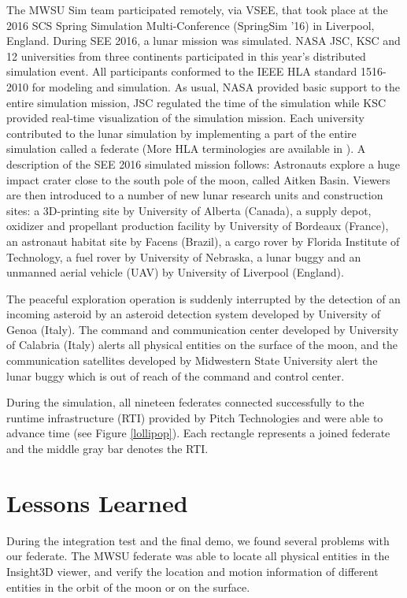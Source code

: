 \documentclass[journal, onecolumn]{IEEEtran}
\begin{document}
The MWSU Sim team participated remotely, via VSEE, that took place at the 2016 SCS Spring Simulation Multi-Conference (SpringSim '16) in Liverpool, England.  During SEE 2016, a lunar mission was simulated. NASA JSC, KSC and 12 universities from three continents participated in this year\rq{}s distributed simulation event. All participants conformed to the IEEE HLA standard 1516-2010 for modeling and simulation. As usual, NASA provided basic support to the entire simulation mission, JSC regulated the time of the simulation while KSC provided real-time visualization of the simulation mission. Each university contributed to the lunar simulation by implementing a part of the entire simulation called a federate (More HLA terminologies are available in \cite{HLA}). A description of the SEE 2016 simulated mission follows: Astronauts explore a huge impact crater close to the south pole of the moon, called Aitken Basin.  Viewers are then introduced to a number of new lunar research units and construction sites: a 3D-printing site by University of Alberta (Canada), a supply depot, oxidizer and propellant production facility by University of Bordeaux (France), an astronaut habitat site by Facens (Brazil), a cargo rover by Florida Institute of Technology, a fuel rover by University of Nebraska, a lunar buggy and an unmanned aerial vehicle (UAV) by University of Liverpool (England).

The peaceful exploration operation is suddenly interrupted by the detection of an incoming asteroid by an asteroid detection system developed by University of Genoa (Italy). The command and communication center \cite{falcone2014simulation} developed by University of Calabria (Italy) alerts all physical entities on the surface of the moon, and the communication satellites developed by Midwestern State University alert the lunar buggy which is out of reach of the command and control center.

During the simulation, all nineteen federates connected successfully to the runtime infrastructure (RTI) provided by Pitch Technologies and were able to advance time (see Figure \ref{lollipop}). Each rectangle represents a joined federate and the middle gray bar denotes the RTI.

\section{Lessons Learned}
During the integration test and the final demo, we found several problems with our federate.  The MWSU federate was able to locate all physical entities in the Insight3D viewer, and verify the location and motion information of different entities in the orbit of the moon or on the surface.  
\end{document}
